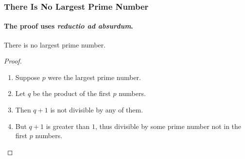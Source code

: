 \documentclass{beamer}
\begin{document}
\begin{frame}
\frametitle{There Is No Largest Prime Number}
\framesubtitle{The proof uses \textit{reductio ad absurdum}.}
\begin{theorem}
There is no largest prime number.
\end{theorem}

\begin{proof}
\begin{enumerate}
\item<1-> Suppose $p$ were the largest prime number.
\item<2-> Let $q$ be the product of the first $p$ numbers.
\item<3-> Then $q + 1$ is not divisible by any of them.
\item<1-> But $q + 1$ is greater than $1$, thus divisible by some prime
number not in the first $p$ numbers.\qedhere
\end{enumerate}
\end{proof}
\end{frame}
\end{document}
